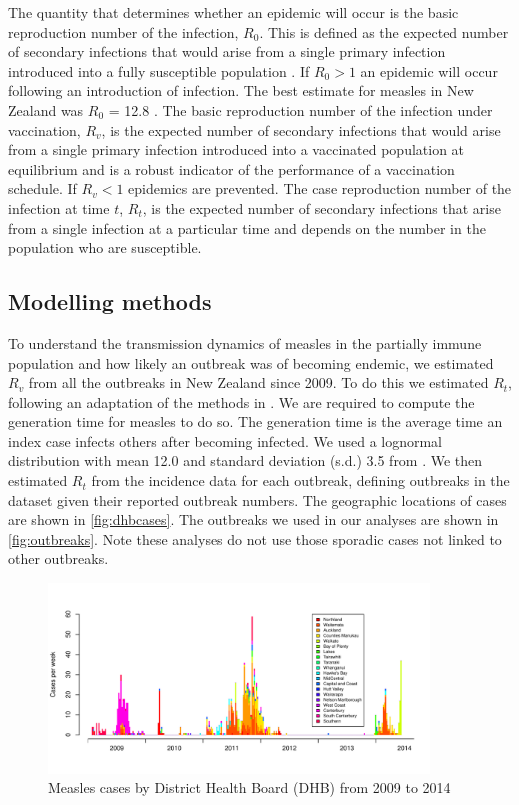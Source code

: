 \documentclass{article}
\begin{document}
The quantity that determines whether an epidemic will occur is the basic reproduction number of the infection, $R_0$. This is defined as the expected number of secondary infections that would arise from a single primary infection introduced into a fully susceptible population \citep{anderson91, diekmann13}. If $R_0 > 1$ an epidemic will occur following an introduction of infection. The best estimate for measles in New Zealand was $R_0$ = 12.8 \citep{roberts4}. The basic reproduction number of the infection under vaccination, $R_v$, is the expected number of secondary infections that would arise from a single primary infection introduced into a vaccinated population at equilibrium and is a robust indicator of the performance of a vaccination schedule. If $R_v < 1$ epidemics are prevented. The case reproduction number of the infection at time $t$, $R_t$, is the expected number of secondary infections that arise from a single infection at a particular time and depends on the number in the population who are susceptible.

\subsection{Modelling methods}

To understand the transmission dynamics of measles in the partially immune population and how likely an outbreak was of becoming endemic, we estimated $R_v$ from all the outbreaks in New Zealand since 2009. To do this we estimated $R_t$, following an adaptation of the methods in \citep{obidia12,wallinga4}. We are required to compute the generation time for measles to do so. The generation time is the average time an index case infects others after becoming infected. We used a lognormal distribution with mean 12.0 and standard deviation (s.d.) 3.5 from \citep{klinkenberg11}. We then estimated $R_t$ from the incidence data for each outbreak, defining outbreaks in the dataset given their reported outbreak numbers. The geographic locations of cases are shown in \autoref{fig:dhbcases}. The outbreaks we used in our analyses are shown in \autoref{fig:outbreaks}. Note these analyses do not use those sporadic cases not linked to other outbreaks.

\begin{figure}
\begin{center}
     \includegraphics[width=0.9\textwidth]{cases_by_dhb_2009_2014.pdf}
          \end{center}
\caption{Measles cases by District Health Board (DHB) from 2009 to 2014}
     \label{fig:dhbcases}
\end{figure}
\end{document}
